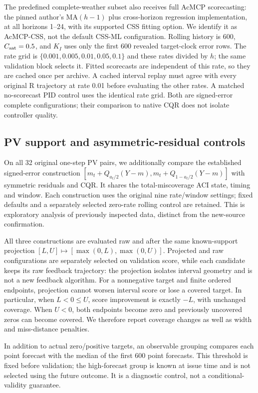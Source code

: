 The predefined complete-weather subset also receives full AcMCP scorecasting: the
pinned author's MA$(h-1)$ plus cross-horizon regression implementation, at all horizons
1--24, with its supported CSS fitting option. We identify it as AcMCP-CSS, not the
default CSS-ML configuration. Rolling history is 600, $C_{\rm sat}=0.5$, and $K_I$
uses only the first 600 revealed target-clock error rows. The rate grid is
$\{0.001,0.005,0.01,0.05,0.1\}$ and these rates divided by $h$; the same validation
block selects it. Fitted scorecasts are independent of this rate, so they are cached
once per archive. A cached interval replay must agree with every original R trajectory
at rate 0.01 before evaluating the other rates. A matched no-scorecast PID control
uses the identical rate grid. Both are signed-error complete configurations; their
comparison to native CQR does not isolate controller quality.

\subsection{PV support and asymmetric-residual controls}\label{sec:pvcontrol}
On all 32 original one-step PV pairs, we additionally compare the established
signed-error construction
$[m_t+Q_{a_t/2}(Y-m),m_t+Q_{1-a_t/2}(Y-m)]$ with symmetric residuals and CQR.
It shares the total-miscoverage ACI state, timing and window. Each construction
uses the original nine rate/window settings; fixed defaults and a separately selected
zero-rate rolling control are retained. This is exploratory analysis of previously
inspected data, distinct from the new-source confirmation.

All three constructions are evaluated raw and after the same known-support projection
$[L,U]\mapsto[\max(0,L),\max(0,U)]$. Projected and raw configurations are separately
selected on validation score, while each candidate keeps its raw feedback trajectory:
the projection isolates interval geometry and is not a new feedback algorithm.
For a nonnegative target and finite ordered endpoints, projection cannot worsen
interval score or lose a covered target. In particular, when $L<0\leq U$, score
improvement is exactly $-L$, with unchanged coverage. When $U<0$, both endpoints
become zero and previously uncovered zeros can become covered. We therefore report
coverage changes as well as width and miss-distance penalties.

In addition to actual zero/positive targets, an observable grouping compares each point
forecast with the median of the first 600 point forecasts. This threshold is fixed
before validation; the high-forecast group is known at issue time and is not selected
using the future outcome. It is a diagnostic control, not a conditional-validity guarantee.
